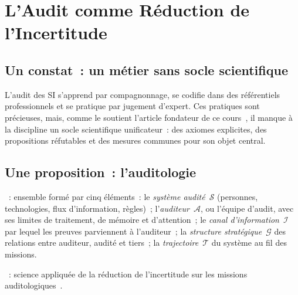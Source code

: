 \section{L'Audit comme Réduction de l'Incertitude}
\label{sec:c01-auditologie}

\subsection{Un constat~: un métier sans socle scientifique}

L'audit des SI s'apprend par compagnonnage, se codifie dans des
référentiels professionnels et se pratique par jugement d'expert. Ces
pratiques sont précieuses, mais, comme le soutient l'article fondateur de
ce cours~\cite{minka2026auditologie}, il manque à la discipline un socle
scientifique unificateur~: des axiomes explicites, des propositions
réfutables et des mesures communes pour son objet central.

\subsection{Une proposition~: l'auditologie}

\begin{boxdef}
~: ensemble
formé par cinq éléments~: le \emph{système audité}~$\mathcal{S}$ (personnes,
technologies, flux d'information, règles)~; l'\emph{auditeur}~$\mathcal{A}$,
ou l'équipe d'audit, avec ses limites de traitement, de mémoire et
d'attention~; le \emph{canal d'information}~$\mathcal{I}$ par lequel les
preuves parviennent à l'auditeur~; la \emph{structure stratégique}~$\mathcal{G}$
des relations entre auditeur, audité et tiers~; la \emph{trajectoire}~$\mathcal{T}$
du système au fil des missions.

\medskip
{}~: science appliquée de la
réduction de l'incertitude sur les missions
auditologiques~\cite{minka2026auditologie}.
\end{boxdef}

